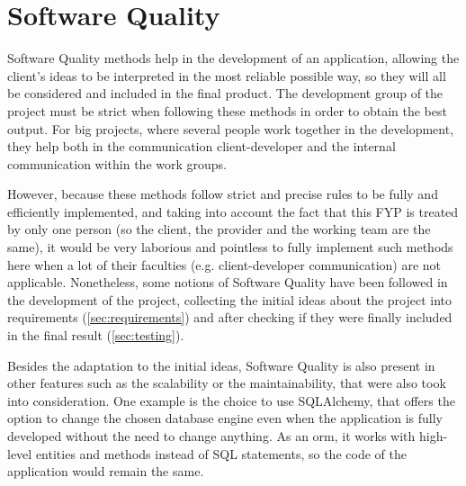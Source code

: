                                                                                              
\section{Software Quality}
Software Quality methods help in the development of an application, allowing the client's ideas to be interpreted in the most reliable possible way, so they will all be considered and included in the final product. The development group of the project must be strict when following these methods in order to obtain the best output. For big projects, where several people work together in the development, they help both in the communication client-developer and the internal communication within the work groups.

However, because these methods follow strict and precise rules to be fully and efficiently implemented, and taking into account the fact that this FYP is treated by only one person (so the client, the provider and the working team are the same), it would be very laborious and pointless to fully implement such methods here when a lot of their faculties (e.g. client-developer communication) are not applicable. Nonetheless, some notions of Software Quality have been followed in the development of the project, collecting the initial ideas about the project into requirements (\ref{sec:requirements}) and after checking if they were finally included in the final result (\ref{sec:testing}).

Besides the adaptation to the initial ideas, Software Quality is also present in other features such as the scalability or the maintainability, that were also took into consideration. One example is the choice to use SQLAlchemy, that offers the option to change the chosen database engine even when the application is fully developed without the need to change anything. As an \gls{orm}, it works with high-level entities and methods instead of SQL statements, so the code of the application would remain the same. 

